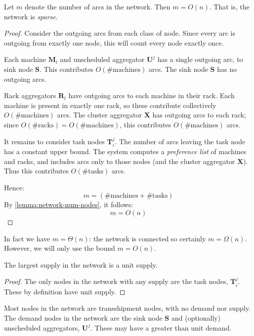\begin{lemma} \label{lemma:network-num-arcs}
Let $m$ denote the number of arcs in the network. Then $m = O(n)$. That is, the network is \emph{sparse}.
\end{lemma}
\begin{proof}
Consider the outgoing arcs from each class of node. Since every arc is outgoing from exactly one node, this will count every node exactly once.

Each machine $\mathbf{M}_l$ and unscheduled aggregator $\mathbf{U}^j$ has a single outgoing arc, to sink node $\mathbf{S}$. This contributes $O\left(\text{\# machines}\right)$ arcs. The sink node $\mathbf{S}$ has no outgoing arcs.

Rack aggregators $\mathbf{R}_l$ have outgoing arcs to each machine in their rack. Each machine is present in exactly one rack, so these contribute collectively $O\left(\text{\# machines}\right)$ arcs. The cluster aggregator $\mathbf{X}$ has outgoing arcs to each rack; since $O\left(\text{\# racks}\right) = O\left(\text{\# machines}\right)$, this contributes $O\left(\text{\# machines}\right)$ arcs.

It remains to consider task nodes $\mathbf{T}_i^j$. The number of arcs leaving the task node has a constant upper bound. The system computes a \emph{preference list} of machines and racks, and includes arcs only to those nodes (and the cluster aggregator $\mathbf{X}$). Thus this contributes $O\left(\text{\# tasks}\right)$ arcs.

Hence:
\[m = \left(\text{\# machines} + \text{\# tasks}\right)\]
By \cref{lemma:network-num-nodes}, it follows:
\[m = O(n)\]
\end{proof}

\begin{remark}
In fact we have $m = \Theta(n)$: the network is connected so certainly $m = \Omega(n)$. However, we will only use the bound $m = O(n)$.\\
\end{remark}

\begin{lemma} \label{lemma:network-supply}
The largest supply in the network is a unit supply.
\end{lemma}
\begin{proof}
The only nodes in the network with any supply are the task nodes, $\mathbf{T}_i^j$. These by definition have unit supply.
\end{proof}

\begin{remark}
Most nodes in the network are transshipment nodes, with no demand nor supply. The demand nodes in the network are the sink node $\mathbf{S}$ and (optionally) unscheduled aggregators, $\mathbf{U}^j$. These may have a greater than unit demand.
\end{remark}

